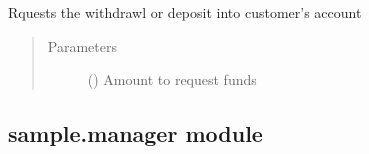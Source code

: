 \documentclass[letterpaper,10pt,english]{sphinxmanual}
\begin{document}
\begin{fulllineitems}
\begin{fulllineitems}
\begin{quote}
\begin{description}
\end{description}\end{quote}

\end{fulllineitems}


\begin{fulllineitems}
\label{\detokenize{sample:sample.customer.Customer.requestDelta}}
Rquests the withdrawl or deposit into customer’s account
\begin{quote}\begin{description}
\item[{Parameters}] \leavevmode
{} () \textendash{} Amount to request funds

\end{description}\end{quote}

\end{fulllineitems}


\end{fulllineitems}



\subsection{sample.manager module}
\label{\detokenize{sample:sample-manager-module}}\label{\detokenize{sample:module-sample.manager}}
\end{document}
